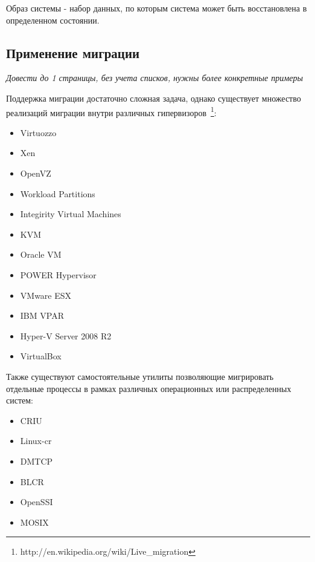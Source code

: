 \begin{Def}\label{process_image}
Образ системы - набор данных, по которым система может быть восстановлена в определенном состоянии.
\end{Def}

\subsection{Применение миграции}\label{migration_applications}

\textit{Довести до 1 страницы, без учета списков, нужны более конкретные примеры}

Поддержка миграции достаточно сложная задача, однако существует множество реализаций миграции внутри различных гипервизоров~\footnote{http://en.wikipedia.org/wiki/Live\_migration}:

\begin{itemize}

    \item Virtuozzo
    \item Xen
    \item OpenVZ
    \item Workload Partitions
    \item Integirity Virtual Machines
    \item KVM
    \item Oracle VM
    \item POWER Hypervisor
    \item VMware ESX
    \item IBM VPAR
    \item Hyper-V Server 2008 R2
    \item VirtualBox

\end{itemize}

Также существуют самостоятельные утилиты позволяющие мигрировать отдельные процессы в рамках различных операционных или распределенных систем:

\begin{itemize}

    \item CRIU
    \item Linux-cr
    \item DMTCP
    \item BLCR
    \item OpenSSI
    \item MOSIX

\end{itemize}

